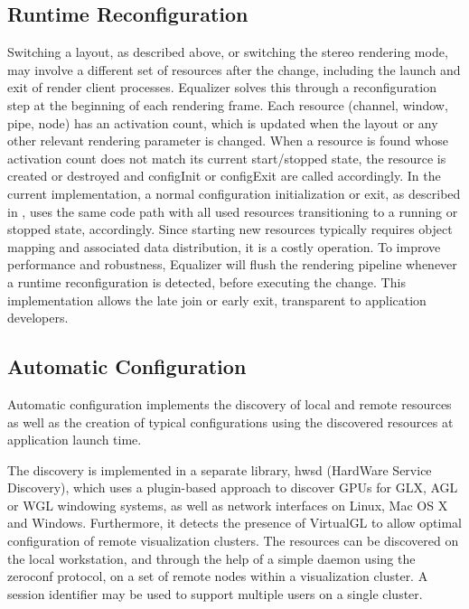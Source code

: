 \documentclass[10pt,journal,compsoc]{IEEEtran}
\begin{document}
\subsection{Runtime Reconfiguration}\label{sec:reconfig}

Switching a layout, as described above, or switching the stereo rendering mode,
may involve a different set of resources after the change, including the launch
and exit of render client processes. Equalizer solves this through a
reconfiguration step at the beginning of each rendering frame. Each resource
(channel, window, pipe, node) has an activation count, which is updated when the
layout or any other relevant rendering parameter is changed. When a resource is
found whose activation count does not match its current start/stopped state, the
resource is created or destroyed and \textsf{configInit} or \textsf{configExit}
are called accordingly. In the current implementation, a normal configuration
initialization or exit, as described in \cite{EMP:09}, uses the same code path
with all used resources transitioning to a running or stopped state,
accordingly. Since starting new resources typically requires object mapping and
associated data distribution, it is a costly operation. To improve performance
and robustness, Equalizer will flush the rendering pipeline whenever a runtime
reconfiguration is detected, before executing the change. This implementation
allows the late join or early exit, transparent to application developers.


\subsection{Automatic Configuration}

Automatic configuration implements the discovery of local and remote resources
as well as the creation of typical configurations using the discovered resources
at application launch time.

The discovery is implemented in a separate library, hwsd (HardWare Service
Discovery), which uses a plugin-based approach to discover GPUs for GLX, AGL or
WGL windowing systems, as well as network interfaces on Linux, Mac OS X and
Windows. Furthermore, it detects the presence of VirtualGL to allow optimal
configuration of remote visualization clusters. The resources can be discovered
on the local workstation, and through the help of a simple daemon using the
zeroconf protocol, on a set of remote nodes within a visualization cluster. A
session identifier may be used to support multiple users on a single cluster.
\end{document}
